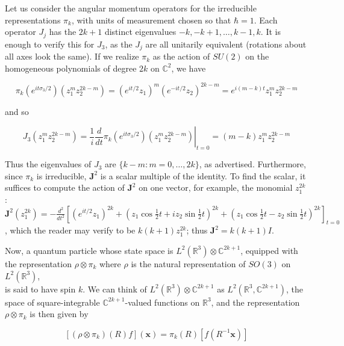 \documentclass[10pt, letterpaper]{article}
\begin{document}
Let us consider the angular momentum operators for the irreducible representations $\pi_{k}$, with units of measurement chosen so that $\hbar=1$. Each operator $J_{j}$ has the $2 k+1$ distinct eigenvalues $-k,-k+1, \ldots, k-1, k$. It is enough to verify this for $J_{3}$, as the $J_{j}$ are all unitarily equivalent (rotations about all axes look the same). If we realize $\pi_{k}$ as the action of $S U(2)$ on the homogeneous polynomials of degree $2 k$ on $\mathbb{C}^{2}$, we have

$$
\pi_{k}\left(e^{i t \sigma_{3} / 2}\right)\left(z_{1}^{m} z_{2}^{2 k-m}\right)=\left(e^{i t / 2} z_{1}\right)^{m}\left(e^{-i t / 2} z_{2}\right)^{2 k-m}=e^{i(m-k) t} z_{1}^{m} z_{2}^{2 k-m}
$$

and so

$$
J_{3}\left(z_{1}^{m} z_{2}^{2 k-m}\right)=\left.\frac{1}{i} \frac{d}{d t} \pi_{k}\left(e^{i t \sigma_{3} / 2}\right)\left(z_{1}^{m} z_{2}^{2 k-m}\right)\right|_{t=0}=(m-k) z_{1}^{m} z_{2}^{2 k-m}
$$

Thus the eigenvalues of $J_{3}$ are $\{k-m: m=0, \ldots, 2 k\}$, as advertised. Furthermore, since $\pi_{k}$ is irreducible, $\mathbf{J}^{2}$ is a scalar multiple of the identity. To find the scalar, it suffices to compute the action of $\mathbf{J}^{2}$ on one vector, for example, the monomial $z_{1}^{2 k}$ :\\
$\mathbf{J}^{2}\left(z_{1}^{2 k}\right)=-\frac{d^{2}}{d t^{2}}\left[\left(e^{i t / 2} z_{1}\right)^{2 k}+\left(z_{1} \cos \frac{1}{2} t+i z_{2} \sin \frac{1}{2} t\right)^{2 k}+\left(z_{1} \cos \frac{1}{2} t-z_{2} \sin \frac{1}{2} t\right)^{2 k}\right]_{t=0}$, which the reader may verify to be $k(k+1) z_{1}^{2 k}$; thus $\mathbf{J}^{2}=k(k+1) I$.

Now, a quantum particle whose state space is $L^{2}\left(\mathbb{R}^{3}\right) \otimes \mathbb{C}^{2 k+1}$, equipped with the representation $\rho \otimes \pi_{k}$ where $\rho$ is the natural representation of $S O(3)$ on $L^{2}\left(\mathbb{R}^{3}\right)$,\\
is said to have spin $k$. We can think of $L^{2}\left(\mathbb{R}^{3}\right) \otimes \mathbb{C}^{2 k+1}$ as $L^{2}\left(\mathbb{R}^{3}, \mathbb{C}^{2 k+1}\right)$, the space of square-integrable $\mathbb{C}^{2 k+1}$-valued functions on $\mathbb{R}^{3}$, and the representation $\rho \otimes \pi_{k}$ is then given by

$$
\left[\left(\rho \otimes \pi_{k}\right)(R) f\right](\mathbf{x})=\pi_{k}(R)\left[f\left(R^{-1} \mathbf{x}\right)\right]
$$
\end{document}
